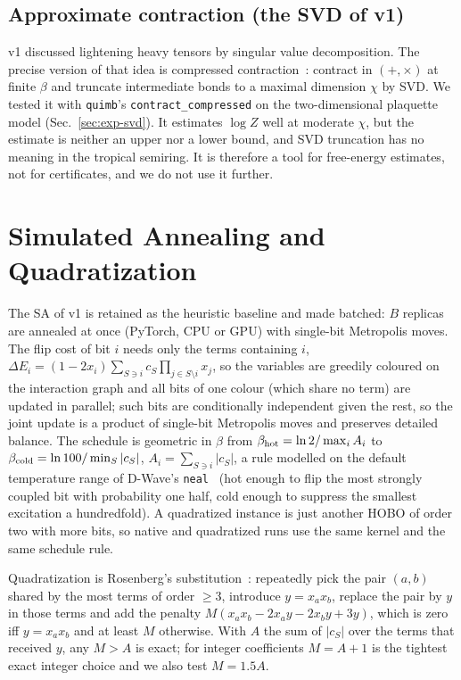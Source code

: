 \documentclass{article}
\begin{document}
\subsection{Approximate contraction (the SVD of v1)}
v1 discussed lightening heavy tensors by singular value decomposition. The precise version of that idea is compressed contraction~\cite{pan2020contracting,gray2024hyperoptimized}: contract in $(+,\times)$ at finite $\beta$ and truncate intermediate bonds to a maximal dimension $\chi$ by SVD. We tested it with \texttt{quimb}'s \texttt{contract\_compressed} on the two-dimensional plaquette model (Sec.~\ref{sec:exp-svd}). It estimates $\log Z$ well at moderate $\chi$, but the estimate is neither an upper nor a lower bound, and SVD truncation has no meaning in the tropical semiring. It is therefore a tool for free-energy estimates, not for certificates, and we do not use it further.

\section{Simulated Annealing and Quadratization}
\label{sec:sa}

The SA of v1 is retained as the heuristic baseline and made batched: $B$ replicas are annealed at once (PyTorch, CPU or GPU) with single-bit Metropolis moves. The flip cost of bit $i$ needs only the terms containing $i$, $\Delta E_i=(1-2x_i)\sum_{S\ni i}c_S\prod_{j\in S\setminus i}x_j$, so the variables are greedily coloured on the interaction graph and all bits of one colour (which share no term) are updated in parallel; such bits are conditionally independent given the rest, so the joint update is a product of single-bit Metropolis moves and preserves detailed balance. The schedule is geometric in $\beta$ from $\beta_{\rm hot}=\ln 2/\max_i A_i$ to $\beta_{\rm cold}=\ln 100/\min_S|c_S|$, $A_i=\sum_{S\ni i}|c_S|$, a rule modelled on the default temperature range of D-Wave's \texttt{neal}~\cite{dwaveneal} (hot enough to flip the most strongly coupled bit with probability one half, cold enough to suppress the smallest excitation a hundredfold). A quadratized instance is just another HOBO of order two with more bits, so native and quadratized runs use the same kernel and the same schedule rule.

Quadratization is Rosenberg's substitution~\cite{rosenberg1975reduction}: repeatedly pick the pair $(a,b)$ shared by the most terms of order $\ge 3$, introduce $y=x_ax_b$, replace the pair by $y$ in those terms and add the penalty $M(x_ax_b-2x_ay-2x_by+3y)$, which is zero iff $y=x_ax_b$ and at least $M$ otherwise. With $A$ the sum of $|c_S|$ over the terms that received $y$, any $M>A$ is exact; for integer coefficients $M=A+1$ is the tightest exact integer choice and we also test $M=1.5A$.
\end{document}

